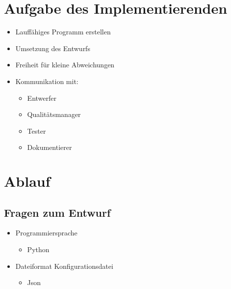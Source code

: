 \documentclass[ignorenonframetext, 11pt, table]{beamer}
\begin{document}
\section{Aufgabe des Implementierenden}
\begin{frame}
	\begin{itemize}
		\item <1->Lauffähiges Programm erstellen
		\item <2->Umsetzung des Entwurfs
		\item <3->Freiheit für kleine Abweichungen
		\item <4->Kommunikation mit:
		\begin{itemize}
			\item <5->Entwerfer
			\item <6->Qualitätsmanager
			\item <7->Tester
			\item <8->Dokumentierer
		\end{itemize}
	\end{itemize}
\end{frame}



\section{Ablauf}
	\subsection{Fragen zum Entwurf}
\begin{frame}
	\begin{itemize}
		\item <2->Programmiersprache
		\begin{itemize}
			\item <3->Python
		\end{itemize}
		\item <4->Dateiformat Konfigurationsdatei
		\begin{itemize}
			\item <5->Json
		\end{itemize}
	\end{itemize}
\end{frame}
\end{document}
